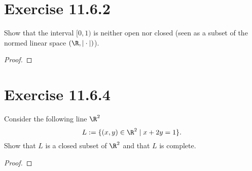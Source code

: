 \documentclass{article}
\begin{document}
    \section{Exercise 11.6.2}
    \begin{problem}
        Show that the interval $[0,1)$ is neither open nor closed (seen as a subset of the normed linear space $(\R, |\cdot|)$).
    \end{problem}

    \begin{proof}
    \end{proof}

    \section{Exercise 11.6.4}
    \begin{problem}
        Consider the following line $\R^2$
        $$L:=\{(x,y) \in \R^2 \mid x+2y = 1\}.$$
        Show that $L$ is a closed subset of $\R^2$ and that $L$ is complete.
    \end{problem}

    \begin{proof}
    \end{proof}
\end{document}
